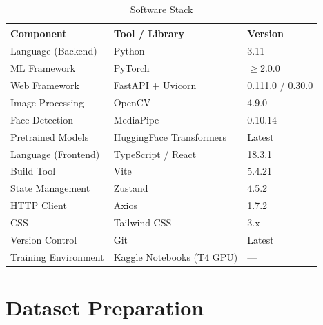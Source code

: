 \renewcommand{\arraystretch}{1.3}
\begin{table}[htbp]
  \centering
  \begin{tabular}{|l|l|l|}
  \hline
  \textbf{Component} & \textbf{Tool / Library} & \textbf{Version} \\
  \hline
  Language (Backend)         & Python                        & 3.11      \\
  ML Framework               & PyTorch                        & $\geq$2.0.0 \\
  Web Framework              & FastAPI + Uvicorn              & 0.111.0 / 0.30.0 \\
  Image Processing           & OpenCV                         & 4.9.0   \\
  Face Detection             & MediaPipe                      & 0.10.14 \\
  Pretrained Models          & HuggingFace Transformers       & Latest  \\
  \hline
  Language (Frontend)        & TypeScript / React             & 18.3.1  \\
  Build Tool                 & Vite                           & 5.4.21  \\
  State Management           & Zustand                        & 4.5.2   \\
  HTTP Client                & Axios                          & 1.7.2   \\
  CSS                        & Tailwind CSS                   & 3.x     \\
  \hline
  Version Control            & Git                            & Latest  \\
  Training Environment       & Kaggle Notebooks (T4 GPU)      & ---     \\
  \hline
  \end{tabular}
  \caption{Software Stack}
  \label{tab:software}
\end{table}

\section{Dataset Preparation}

